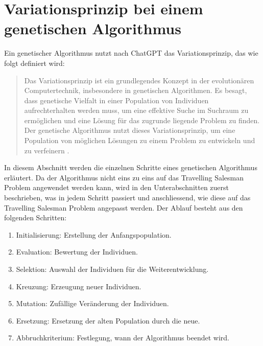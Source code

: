 %
%
%
%
\section{Variationsprinzip bei einem genetischen Algorithmus
\label{buch:paper:varalg:section:genetic_algorithm_process}}
Ein genetischer Algorithmus nutzt nach ChatGPT das Variationsprinzip, 
das wie folgt definiert wird:
\begin{quote}
Das Variationsprinzip ist ein grundlegendes Konzept in der 
evolutionären Computertechnik, insbesondere in genetischen 
Algorithmen. Es besagt, dass genetische Vielfalt in einer 
Population von Individuen aufrechterhalten werden muss, 
um eine effektive Suche im Suchraum zu ermöglichen und eine 
Lösung für das zugrunde liegende Problem zu finden.
\\
Der genetische Algorithmus nutzt dieses Variationsprinzip, um eine 
Population von möglichen Lösungen zu einem Problem zu entwickeln 
und zu verfeinern \cite{chatgpt2024}.
\end{quote}
In diesem Abschnitt werden die einzelnen Schritte eines genetischen Algorithmus 
erläutert. Da der Algorithmus nicht eins zu eins auf das Travelling Salesman
Problem angewendet werden kann, wird in den Unterabschnitten zuerst beschrieben,
was in jedem Schritt passiert und anschliessend, wie diese auf das Travelling 
Salesman Problem angepasst werden.
Der Ablauf besteht aus den folgenden Schritten:
\begin{enumerate}
    \item Initialisierung: Erstellung der Anfangspopulation.
    \item Evaluation: Bewertung der Individuen.
    \item Selektion: Auswahl der Individuen für die Weiterentwicklung.
    \item Kreuzung: Erzeugung neuer Individuen.
    \item Mutation: Zufällige Veränderung der Individuen.
    \item Ersetzung: Ersetzung der alten Population durch die neue.
    \item Abbruchkriterium: Festlegung, wann der Algorithmus beendet wird.
\end{enumerate}








